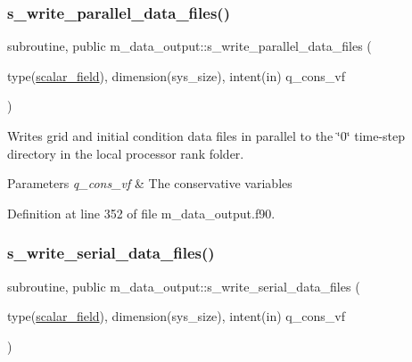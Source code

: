 \subsubsection{\texorpdfstring{s\+\_\+write\+\_\+parallel\+\_\+data\+\_\+files()}{s\_write\_parallel\_data\_files()}}
{\footnotesize\ttfamily subroutine, public m\+\_\+data\+\_\+output\+::s\+\_\+write\+\_\+parallel\+\_\+data\+\_\+files (\begin{DoxyParamCaption}\item[{type(\hyperlink{structm__derived__types_1_1scalar__field}{scalar\+\_\+field}), dimension(sys\+\_\+size), intent(in)}]{q\+\_\+cons\+\_\+vf }\end{DoxyParamCaption})}



Writes grid and initial condition data files in parallel to the \char`\"{}0\char`\"{} time-\/step directory in the local processor rank folder. 


\begin{DoxyParams}{Parameters}
{\em q\+\_\+cons\+\_\+vf} & The conservative variables \\
\hline
\end{DoxyParams}


Definition at line 352 of file m\+\_\+data\+\_\+output.\+f90.

\mbox{\label{namespacem__data__output_abaf86e34cd05a2227a23bcef0671a391}} 
\subsubsection{\texorpdfstring{s\+\_\+write\+\_\+serial\+\_\+data\+\_\+files()}{s\_write\_serial\_data\_files()}}
{\footnotesize\ttfamily subroutine, public m\+\_\+data\+\_\+output\+::s\+\_\+write\+\_\+serial\+\_\+data\+\_\+files (\begin{DoxyParamCaption}\item[{type(\hyperlink{structm__derived__types_1_1scalar__field}{scalar\+\_\+field}), dimension(sys\+\_\+size), intent(in)}]{q\+\_\+cons\+\_\+vf }\end{DoxyParamCaption})}



